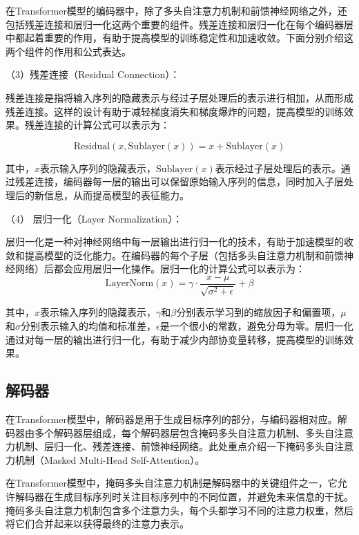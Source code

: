 在Transformer模型的编码器中，除了多头自注意力机制和前馈神经网络之外，还包括残差连接和层归一化这两个重要的组件。残差连接和层归一化在每个编码器层中都起着重要的作用，有助于提高模型的训练稳定性和加速收敛。下面分别介绍这两个组件的作用和公式表达。


（3）残差连接（Residual Connection）：

残差连接是指将输入序列的隐藏表示与经过子层处理后的表示进行相加，从而形成残差连接。这样的设计有助于减轻梯度消失和梯度爆炸的问题，提高模型的训练效果。残差连接的计算公式可以表示为：

\begin{equation}
	\text{Residual}(x, \text{Sublayer}(x)) = x + \text{Sublayer}(x)
\end{equation}


其中，$x$表示输入序列的隐藏表示，$\text{Sublayer}(x)$表示经过子层处理后的表示。通过残差连接，编码器每一层的输出可以保留原始输入序列的信息，同时加入子层处理后的新信息，从而提高模型的表征能力。

（4） 层归一化（Layer Normalization）：

层归一化是一种对神经网络中每一层输出进行归一化的技术，有助于加速模型的收敛和提高模型的泛化能力。在编码器的每个子层（包括多头自注意力机制和前馈神经网络）后都会应用层归一化操作。层归一化的计算公式可以表示为：
\begin{equation}
	\text{LayerNorm}(x) = \gamma \cdot \frac{x - \mu}{\sqrt{\sigma^2 + \epsilon}} + \beta
\end{equation}

其中，$x$表示输入序列的隐藏表示，$\gamma$和$\beta$分别表示学习到的缩放因子和偏置项，$\mu$和$\sigma$分别表示输入的均值和标准差，$\epsilon$是一个很小的常数，避免分母为零。层归一化通过对每一层的输出进行归一化，有助于减少内部协变量转移，提高模型的训练效果。

\subsection{解码器}
在Transformer模型中，解码器是用于生成目标序列的部分，与编码器相对应。解码器由多个解码器层组成，每个解码器层包含掩码多头自注意力机制、多头自注意力机制、层归一化、残差连接、前馈神经网络。此处重点介绍一下掩码多头自注意力机制（Masked Multi-Head Self-Attention）。

在Transformer模型中，掩码多头自注意力机制是解码器中的关键组件之一，它允许解码器在生成目标序列时关注目标序列中的不同位置，并避免未来信息的干扰。掩码多头自注意力机制包含多个注意力头，每个头都学习不同的注意力权重，然后将它们合并起来以获得最终的注意力表示。

